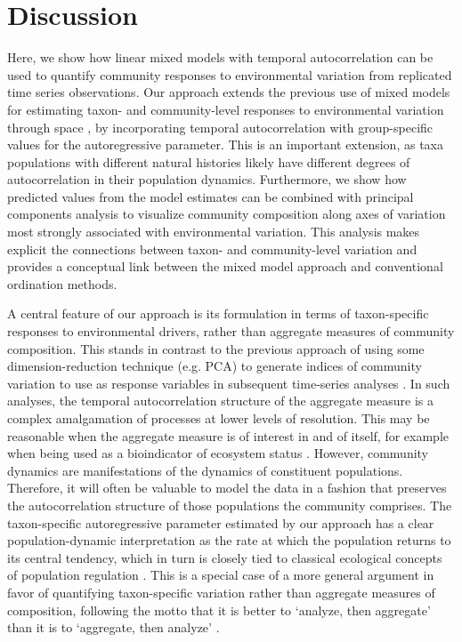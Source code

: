

\section*{Discussion}

Here, we show how linear mixed models with temporal autocorrelation can be used to
quantify community responses to environmental variation from replicated time series
observations.
Our approach extends the previous use of mixed models for estimating taxon- and
community-level responses to environmental variation through space
\citep{Jackson2012, Bartrons2015}, by incorporating temporal autocorrelation with
group-specific values for the autoregressive parameter.
This is an important extension, as taxa populations with different natural histories
likely have different degrees of autocorrelation in their population dynamics.
Furthermore, we show how predicted values from the model estimates can be combined
with principal components analysis \citep[following][]{Jackson2012} to visualize
community composition along axes of variation most strongly associated with
environmental variation.
This analysis makes explicit the connections between taxon- and community-level
variation and provides a conceptual link between the mixed model approach and
conventional ordination methods.


A central feature of our approach is its formulation in terms of taxon-specific
responses to environmental drivers, rather than aggregate measures of community
composition.
This stands in contrast to the previous approach of using some dimension-reduction
technique (e.g. PCA) to generate indices of community variation to use as
response variables in subsequent time-series analyses \citep{Simpson2009}.
In such analyses, the temporal autocorrelation structure of the aggregate measure
is a complex amalgamation of processes at lower levels of resolution.
This may be reasonable when the aggregate measure is of interest in and of itself,
for example when being used as a bioindicator of ecosystem status \citep{Bennion2015}.
However, community dynamics are manifestations of the dynamics of constituent populations.
Therefore, it will often be valuable to model the data in a fashion that preserves the
autocorrelation structure of those populations the community comprises.
The taxon-specific autoregressive parameter estimated by our approach has a
clear population-dynamic interpretation as the rate at which the population returns
to its central tendency, which in turn is closely tied to classical ecological
concepts of population regulation \citep{Nicholson1933, Ziebarth2010}.
This is a special case of a more general argument in favor of quantifying
taxon-specific variation rather than aggregate measures of composition,
following the motto that it is better to ‘analyze, then aggregate’ than it is to
‘aggregate, then analyze’ \citep{Clark2011}.



